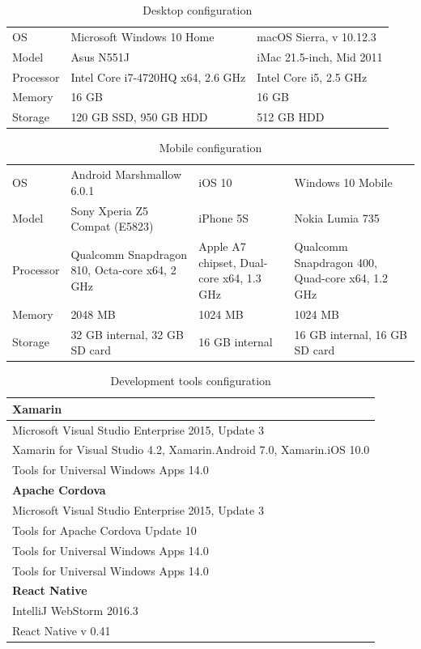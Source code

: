 \documentclass[english,master,public,dept460,male,cpdeclaration,oneside]{diploma}
\begin{document}
\begin{table}[!h]
	\centering
	\caption{Desktop configuration}
	\begin{tabular}{p{2cm} | p{4.5cm} p{4.5cm}}
		\toprule
		OS & Microsoft Windows 10 Home & macOS Sierra, v 10.12.3 \\
		Model & Asus N551J & iMac 21.5-inch, Mid 2011 \\
		Processor & Intel Core i7-4720HQ x64, 2.6 GHz & Intel Core i5, 2.5 GHz \\
		Memory & 16 GB & 16 GB \\
		Storage & 120 GB SSD, 950 GB HDD & 512 GB HDD \\
		\midrule
	\end{tabular}
\end{table}

\begin{table}[!h]
	\centering
	\caption{Mobile configuration}
	\begin{tabular}{p{2cm} | p{3.5cm} p{3.5cm} p{3.5cm}}
		\toprule
		OS & Android Marshmallow 6.0.1 & iOS 10 & Windows 10 Mobile \\
		Model & Sony Xperia Z5 Compat (E5823) & iPhone 5S & Nokia Lumia 735 \\
		Processor & Qualcomm Snapdragon 810, Octa-core x64, 2 GHz & Apple A7 chipset, Dual-core x64, 1.3 GHz & Qualcomm Snapdragon 400, Quad-core x64, 1.2 GHz \\
		Memory & 2048 MB & 1024 MB & 1024 MB \\
		Storage & 32 GB internal, 32 GB SD card & 16 GB internal & 16 GB internal, 16 GB SD card \\
		\midrule
	\end{tabular}
\end{table}

\begin{table}[!h]
	\centering
	\caption{Development tools configuration}
	\begin{tabular}{l}
		\toprule
		\textbf{Xamarin}\\
		\midrule
		Microsoft Visual Studio Enterprise 2015, Update 3 \\
		Xamarin for Visual Studio 4.2, Xamarin.Android 7.0, Xamarin.iOS 10.0 \\
		Tools for Universal Windows Apps 14.0 \\
		\midrule
		\textbf{Apache Cordova}\\
		\midrule
		Microsoft Visual Studio Enterprise 2015, Update 3 \\
		Tools for Apache Cordova Update 10 \\
		Tools for Universal Windows Apps 14.0 \\
		Tools for Universal Windows Apps 14.0 \\
		\midrule
		\textbf{React Native}\\
		\midrule
		IntelliJ WebStorm 2016.3 \\
		React Native v 0.41\\	
		\midrule	
	\end{tabular}
\end{table}
\end{document}

